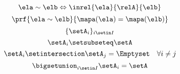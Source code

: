 \begin{forslides}
    \begin{equation}\label{eq:slides_session2_rel_158}
        \ela\sim \elb \Leftrightarrow \inrel{\ela}{\relA}{\elb}
    \end{equation}
    \begin{equation}\label{eq:slides_session2_rel_159}
        \prf{
            \ela\sim \elb
        }{
            \mapa(\ela)=\mapa(\elb)
        }
    \end{equation}
    \begin{equation}\label{eq:slides_session2_rel_160}
        \{\setA_i\}_{i\setin I}
    \end{equation}
    \begin{equation}\label{eq:slides_session2_rel_161}
        \setA_i\setsubseteq \setA
    \end{equation}
    \begin{equation}\label{eq:slides_session2_rel_162}
        \setA_i\setintersection \setA_j=\Emptyset \quad \forall i\neq j
    \end{equation}
    \begin{equation}\label{eq:slides_session2_rel_163}
        \bigsetunion_{i\setin I}\setA_i=\setA
    \end{equation}


\end{forslides}
